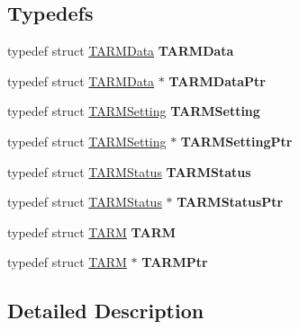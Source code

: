 \subsection*{Typedefs}
\begin{DoxyCompactItemize}
\item 
\hypertarget{group___arm_strc_gaeb67b10038fceabb1da830c5b6c878ba}{typedef struct \hyperlink{struct_t_a_r_m_data}{T\-A\-R\-M\-Data} {\bfseries T\-A\-R\-M\-Data}}\label{group___arm_strc_gaeb67b10038fceabb1da830c5b6c878ba}

\item 
\hypertarget{group___arm_strc_gac2621e65bdd019038d311f433d6a07e4}{typedef struct \hyperlink{struct_t_a_r_m_data}{T\-A\-R\-M\-Data} $\ast$ {\bfseries T\-A\-R\-M\-Data\-Ptr}}\label{group___arm_strc_gac2621e65bdd019038d311f433d6a07e4}

\item 
\hypertarget{group___arm_strc_gadf94580de8c8f5552da40ace49444c62}{typedef struct \hyperlink{struct_t_a_r_m_setting}{T\-A\-R\-M\-Setting} {\bfseries T\-A\-R\-M\-Setting}}\label{group___arm_strc_gadf94580de8c8f5552da40ace49444c62}

\item 
\hypertarget{group___arm_strc_ga924c67241c768c469cb50248a231d52e}{typedef struct \hyperlink{struct_t_a_r_m_setting}{T\-A\-R\-M\-Setting} $\ast$ {\bfseries T\-A\-R\-M\-Setting\-Ptr}}\label{group___arm_strc_ga924c67241c768c469cb50248a231d52e}

\item 
\hypertarget{group___arm_strc_ga7a7fdeab585def628e1a1a7fb1ecf710}{typedef struct \hyperlink{struct_t_a_r_m_status}{T\-A\-R\-M\-Status} {\bfseries T\-A\-R\-M\-Status}}\label{group___arm_strc_ga7a7fdeab585def628e1a1a7fb1ecf710}

\item 
\hypertarget{group___arm_strc_ga099dcc50df655be82c659b6184aeb1f9}{typedef struct \hyperlink{struct_t_a_r_m_status}{T\-A\-R\-M\-Status} $\ast$ {\bfseries T\-A\-R\-M\-Status\-Ptr}}\label{group___arm_strc_ga099dcc50df655be82c659b6184aeb1f9}

\item 
\hypertarget{group___arm_strc_gaf6b860a6e2de68f65ee8013819814359}{typedef struct \hyperlink{struct_t_a_r_m}{T\-A\-R\-M} {\bfseries T\-A\-R\-M}}\label{group___arm_strc_gaf6b860a6e2de68f65ee8013819814359}

\item 
\hypertarget{group___arm_strc_ga686d9d139a4dc95c801755ba876ed44a}{typedef struct \hyperlink{struct_t_a_r_m}{T\-A\-R\-M} $\ast$ {\bfseries T\-A\-R\-M\-Ptr}}\label{group___arm_strc_ga686d9d139a4dc95c801755ba876ed44a}

\end{DoxyCompactItemize}


\subsection{Detailed Description}
